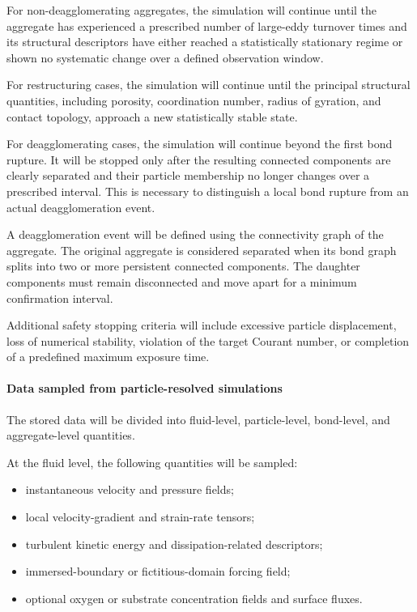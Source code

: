 \documentclass[11pt,a4paper,twoside]{scrartcl}
\begin{document}
For non-deagglomerating aggregates, the simulation will continue until the aggregate has experienced a prescribed number of large-eddy turnover times and its structural descriptors have either reached a statistically stationary regime or shown no systematic change over a defined observation window.

For restructuring cases, the simulation will continue until the principal structural quantities, including porosity, coordination number, radius of gyration, and contact topology, approach a new statistically stable state.

For deagglomerating cases, the simulation will continue beyond the first bond rupture. It will be stopped only after the resulting connected components are clearly separated and their particle membership no longer changes over a prescribed interval. This is necessary to distinguish a local bond rupture from an actual deagglomeration event.

A deagglomeration event will be defined using the connectivity graph of the aggregate. The original aggregate is considered separated when its bond graph splits into two or more persistent connected components. The daughter components must remain disconnected and move apart for a minimum confirmation interval.

Additional safety stopping criteria will include excessive particle displacement, loss of numerical stability, violation of the target Courant number, or completion of a predefined maximum exposure time.

\paragraph{Data sampled from particle-resolved simulations}

The stored data will be divided into fluid-level, particle-level, bond-level, and aggregate-level quantities.

At the fluid level, the following quantities will be sampled:

\begin{itemize}
	\item instantaneous velocity and pressure fields;
	
	\item local velocity-gradient and strain-rate tensors;
	
	\item turbulent kinetic energy and dissipation-related descriptors;
	
	\item immersed-boundary or fictitious-domain forcing field;
	
	\item optional oxygen or substrate concentration fields and surface fluxes.
\end{itemize}
\end{document}
